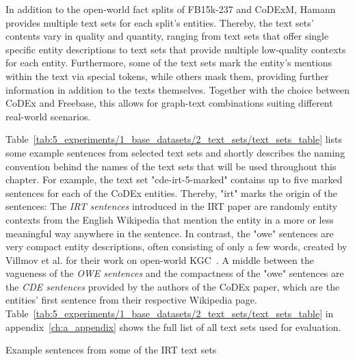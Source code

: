 In addition to the open-world fact splits of FB15k-237 and CoDExM, Hamann provides multiple text sets for each split's entities. Thereby, the text sets' contents vary in quality and quantity, ranging from text sets that offer single specific entity descriptions to text sets that provide multiple low-quality contexts for each entity. Furthermore, some of the text sets mark the entity's mentions within the text via special tokens, while others mask them, providing further information in addition to the texts themselves. Together with the choice between CoDEx and Freebase, this allows for graph-text combinations suiting different real-world scenarios.

Table~\ref{tab:5_experiments/1_base_datasets/2_text_sets/text_sets_table} lists some example sentences from selected text sets and shortly describes the naming convention behind the names of the text sets that will be used throughout this chapter. For example, the text set "cde-irt-5-marked" contains up to five marked sentences for each of the CoDEx entities. Thereby, "irt" marks the origin of the sentences: The \emph{IRT sentences} introduced in the IRT paper are randomly entity contexts from the English Wikipedia that mention the entity in a more or less meaningful way anywhere in the sentence. In contrast, the "owe" sentences are very compact entity descriptions, often consisting of only a few words, created by Villmov et al. for their work on open-world KGC~\cite{Shah2019AnOE}. A middle between the vagueness of the \emph{OWE sentences} and the compactness of the "owe" sentences are the \emph{CDE sentences} provided by the authors of the CoDEx paper, which are the entities' first sentence from their respective Wikipedia page. Table~\ref{tab:5_experiments/1_base_datasets/2_text_sets/text_sets_table} in appendix~\ref{ch:a_appendix} shows the full list of all text sets used for evaluation.

\begin{table}
    \centering
    
    \caption{Example sentences from some of the IRT text sets}
    \label{tab:5_experiments/1_base_datasets/2_text_sets/text_sets_table}
\end{table}
